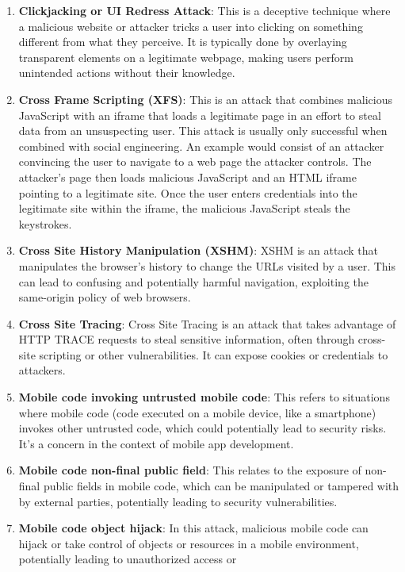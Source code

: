 \begin{enumerate}
\def\labelenumi{\arabic{enumi}.}
\item
  \textbf{Clickjacking or UI Redress Attack}: This is a deceptive technique where a
  malicious website or attacker tricks a user into clicking on something
  different from what they perceive. It is typically done by overlaying
  transparent elements on a legitimate webpage, making users perform
  unintended actions without their knowledge.
\item
  \textbf{Cross Frame Scripting (XFS)}:  This is an attack that combines malicious JavaScript with an iframe that loads a legitimate page in an effort to steal data from an unsuspecting user. This attack is usually only successful when combined with social engineering. An example would consist of an attacker convincing the user to navigate to a web page the attacker controls. The attacker’s page then loads malicious JavaScript and an HTML iframe pointing to a legitimate site. Once the user enters credentials into the legitimate site within the iframe, the malicious JavaScript steals the keystrokes.
\item
  \textbf{Cross Site History Manipulation (XSHM)}: XSHM is an attack
  that manipulates the browser's history to change the URLs visited by a
  user. This can lead to confusing and potentially harmful navigation,
  exploiting the same-origin policy of web browsers.
\item
  \textbf{Cross Site Tracing}: Cross Site Tracing is an attack that
  takes advantage of HTTP TRACE requests to steal sensitive information,
  often through cross-site scripting or other vulnerabilities. It can
  expose cookies or credentials to attackers.
\item
  \textbf{Mobile code invoking untrusted mobile code}: This refers to
  situations where mobile code (code executed on a mobile device, like a
  smartphone) invokes other untrusted code, which could potentially lead
  to security risks. It's a concern in the context of mobile app
  development.
\item
  \textbf{Mobile code non-final public field}: This relates to the
  exposure of non-final public fields in mobile code, which can be
  manipulated or tampered with by external parties, potentially leading
  to security vulnerabilities.
\item
  \textbf{Mobile code object hijack}: In this attack, malicious mobile
  code can hijack or take control of objects or resources in a mobile
  environment, potentially leading to unauthorized access or

\end{enumerate}
